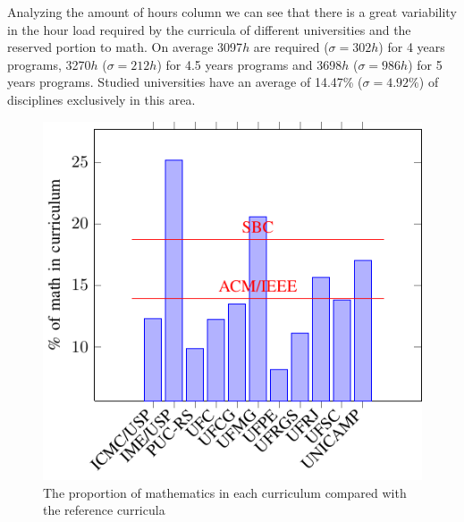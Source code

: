 \documentclass[conference]{IEEEtran}
\begin{document}
	Analyzing the amount of hours column we can see that there is a great variability in the hour load required by the curricula of different universities and the reserved portion to math. On average 3097$h$ are required ($ \sigma = 302h $) for 4 years programs, 3270$h$ ($ \sigma = 212h $) for 4.5 years programs and 3698$h$ ($ \sigma = 986h $) for 5 years programs. Studied universities have an average of 14.47\% ($ \sigma = 4.92\% $) of disciplines exclusively in this area.



%	

\begin{figure}[!t]
\centering
\includegraphics{chart_math}
\caption{The proportion of mathematics in each curriculum compared with the reference curricula}
\label{chart_math}
\end{figure}
\end{document}
